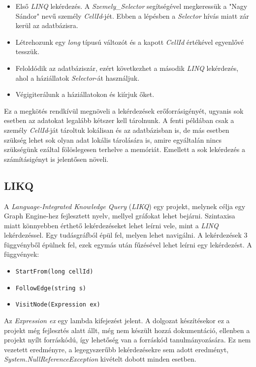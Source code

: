 \begin{itemize}
	\item Első \emph{LINQ} lekérdezés. A \emph{Szemely\_Selector} segítségével megkeressük a "Nagy Sándor" nevű személy \emph{CellId}-jét. Ebben a lépésben a \emph{Selector} hívás miatt zár kerül az adatbázisra.
	\item Létrehozunk egy \emph{long} típusú változót és a kapott \emph{CellId} értékével egyenlővé tesszük.
	\item Feloldódik az adatbáziszár, ezért következhet a második \emph{LINQ} lekérdezés, ahol a háziállatok \emph{Selector}-át használjuk.
	\item Végigiterálunk a háziállatokon és kiírjuk őket.
\end{itemize}

Ez a megkötés rendkívül megnöveli a lekérdezések erőforrásigényét, ugyanis sok esetben az adatokat legalább kétszer kell tárolnunk. A fenti példában csak a személy \emph{CellId}-ját tároltuk lokálisan és az adatbázisban is, de más esetben szükség lehet sok olyan adat lokális tárolására is, amire egyáltalán nincs szükségünk ezáltal fölöslegesen terhelve a memóriát. Emellett a sok lekérdezés a számításigényt is jelentősen növeli.

\subsection{LIKQ}

A \emph{Language-Integrated Knowledge Query} (\emph{LIKQ}) egy projekt, melynek célja egy Graph Engine-hez fejlesztett nyelv, mellyel gráfokat lehet bejárni. Szintaxisa miatt könnyebben érthető lekérdezéseket lehet leírni vele, mint a \emph{LINQ} lekérdezéssel. Egy tudásgráfból épül fel, melyen lehet navigálni. A lekérdezések 3 függvényből épülnek fel, ezek egymás után fűzésével lehet leírni egy lekérdezést. A függvények:

\begin{itemize}
	\item \texttt{StartFrom(long cellId)}
	\item \texttt{FollowEdge(string s)}
	\item \texttt{VisitNode(Expression ex)}
\end{itemize}

Az \emph{Expression ex} egy lambda kifejezést jelent. A dolgozat készítésekor ez a projekt még fejlesztés alatt állt, még nem készült hozzá dokumentáció, ellenben a projekt nyílt forráskódú, így lehetőség van a forráskód tanulmányozására. Ez nem vezetett eredményre, a legegyszerűbb lekérdezésekre sem adott eredményt, \emph{System.NullReferenceException} kivételt dobott minden esetben.